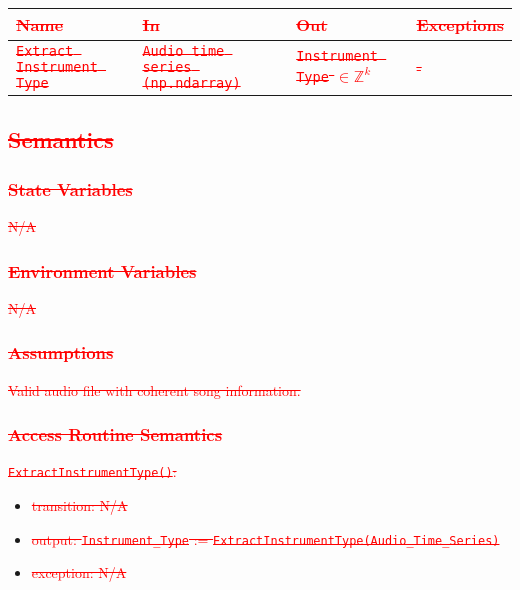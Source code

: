 \documentclass[12pt, titlepage]{article}
\begin{document}
\begin{center}
\begin{tabular}{p{2cm} p{4cm} p{4cm} p{2cm}}
\hline
\textcolor{red}{\sout{\textbf{Name}}} & \textcolor{red}{\sout{\textbf{In}}} & \textcolor{red}{\sout{\textbf{Out}}} & \textcolor{red}{\sout{\textbf{Exceptions}}}\\
\hline
\textcolor{red}{\sout{\texttt{Extract Instrument Type}}} & \textcolor{red}{\sout{\texttt{Audio time series (np.ndarray)}}} & \textcolor{red}{\sout{\texttt{Instrument Type} $\in \mathbb{Z}^k$}} & \textcolor{red}{\sout{-}}\\
\hline
\end{tabular}
\end{center}

\subsection{\textcolor{red}{\sout{Semantics}}}

\subsubsection{\textcolor{red}{\sout{State Variables}}}
\textcolor{red}{\sout{N/A}}

\subsubsection{\textcolor{red}{\sout{Environment Variables}}}
\textcolor{red}{\sout{N/A}}

\subsubsection{\textcolor{red}{\sout{Assumptions}}}
\textcolor{red}{\sout{Valid audio file with coherent song information.}}

\subsubsection{\textcolor{red}{\sout{Access Routine Semantics}}}

\noindent \textcolor{red}{\sout{\texttt{ExtractInstrumentType()}:}}
\begin{itemize}
\item \textcolor{red}{\sout{transition: N/A}}
\item \textcolor{red}{\sout{output: \texttt{Instrument\_Type} := \texttt{ExtractInstrumentType(Audio\_Time\_Series)}}}
\item \textcolor{red}{\sout{exception: N/A}}
\end{itemize}
\end{document}
